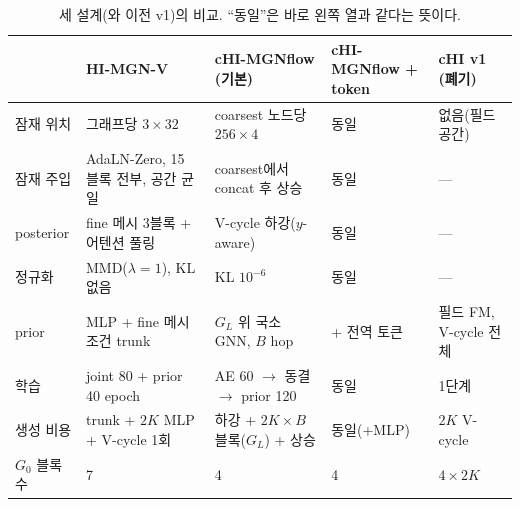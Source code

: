 \documentclass[11pt]{article}
\begin{document}
\begin{table}[!htbp]
\centering
\footnotesize
\begin{tabularx}{\textwidth}{@{}l Y Y Y Y@{}}
\toprule
 & HI-MGN-V & cHI-MGNflow (기본) & cHI-MGNflow + token & cHI v1 (폐기) \\
\midrule
잠재 위치 & 그래프당 $3\times32$ & coarsest 노드당 $256\times4$ & 동일 & 없음(필드 공간) \\
잠재 주입 & AdaLN-Zero, 15 블록 전부, 공간 균일 & coarsest에서 concat 후 상승 & 동일 & --- \\
posterior & fine 메시 3블록 + 어텐션 풀링 & V-cycle 하강($y$-aware) & 동일 & --- \\
정규화 & MMD($\lambda=1$), KL 없음 & KL $10^{-6}$ & 동일 & --- \\
prior & MLP + fine 메시 조건 trunk & $G_L$ 위 국소 GNN, $B$ hop & + 전역 토큰 & 필드 FM, V-cycle 전체 \\
학습 & joint 80 + prior 40 epoch & AE 60 $\to$ 동결 $\to$ prior 120 & 동일 & 1단계 \\
생성 비용 & trunk + $2K$ MLP + V-cycle 1회 & 하강 + $2K\times B$ 블록($G_L$) + 상승 & 동일(+MLP) & $2K$ V-cycle \\
$G_0$ 블록 수 & 7 & 4 & 4 & $4\times 2K$ \\
\bottomrule
\end{tabularx}
\caption{세 설계(와 이전 v1)의 비교. ``동일''은 바로 왼쪽 열과 같다는 뜻이다.}
\label{tab:three-designs}
\end{table}
\end{document}
